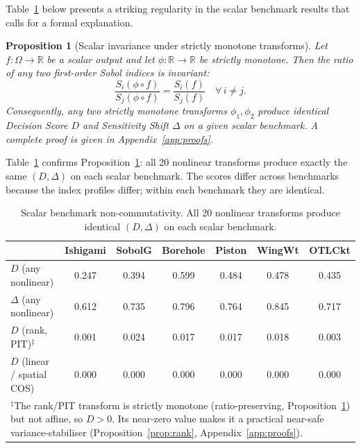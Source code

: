 \documentclass[11pt,onecolumn]{article}
\newtheorem{proposition}{Proposition}
\begin{document}
Table~\ref{tab:scalar_deg} below presents a striking regularity in the scalar
benchmark results that calls for a formal explanation.

\begin{proposition}[Scalar invariance under strictly monotone transforms]
\label{prop:scalar}
Let $f: \Omega \to \mathbb{R}$ be a scalar output and let $\phi: \mathbb{R} \to \mathbb{R}$
be strictly monotone.  Then the ratio of any two first-order Sobol indices is invariant:
\begin{equation}
  \frac{S_i(\phi \circ f)}{S_j(\phi \circ f)}
  = \frac{S_i(f)}{S_j(f)}
  \quad \forall\, i \neq j.
  \label{eq:ratio_inv}
\end{equation}
Consequently, any two strictly monotone transforms $\phi_1, \phi_2$ produce
identical Decision Score $D$ and Sensitivity Shift $\Delta$ on a given scalar
benchmark.  A complete proof is given in Appendix~\ref{app:proofs}.
\end{proposition}

Table~\ref{tab:scalar_deg} confirms Proposition~\ref{prop:scalar}: all 20
nonlinear transforms produce exactly the same $(D, \Delta)$ on each scalar
benchmark. The scores differ across benchmarks because the index profiles
differ; within each benchmark they are identical.

\begin{table}[H]
\centering
\caption{Scalar benchmark non-commutativity. All 20 nonlinear transforms
  produce identical $(D, \Delta)$ on each scalar benchmark.}
\label{tab:scalar_deg}
\small
\begin{tabular}{lcccccc}
\toprule
& Ishigami & SobolG & Borehole & Piston & WingWt & OTLCkt \\
\midrule
$D$ (any nonlinear) & 0.247 & 0.394 & 0.599 & 0.484 & 0.478 & 0.435 \\
$\Delta$ (any nonlinear) & 0.612 & 0.735 & 0.796 & 0.764 & 0.845 & 0.717 \\
\midrule
$D$ (rank, PIT)${}^\ddagger$ & 0.001 & 0.024 & 0.017 & 0.017 & 0.018 & 0.003 \\
$D$ (linear / spatial COS) & 0.000 & 0.000 & 0.000 & 0.000 & 0.000 & 0.000 \\
\bottomrule
\multicolumn{7}{p{0.92\textwidth}}{\footnotesize
  ${}^\ddagger$The rank/PIT transform is strictly monotone (ratio-preserving,
  Proposition~\ref{prop:scalar}) but not affine, so $D>0$.
  Its near-zero value makes it a practical near-safe variance-stabiliser
  (Proposition~\ref{prop:rank}, Appendix~\ref{app:proofs}).} \\
\end{tabular}
\end{table}
\end{document}
